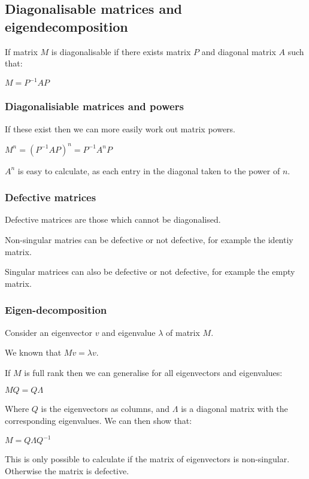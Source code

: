 
\subsection{Diagonalisable matrices and eigendecomposition}

If matrix \(M\) is diagonalisable if there exists matrix \(P\) and diagonal matrix \(A\) such that:

\(M=P^{-1}AP\)

\subsubsection{Diagonalisiable matrices and powers}

If these exist then we can more easily work out matrix powers.

\(M^n=(P^{-1}AP)^n=P^{-1}A^nP\)

\(A^n\) is easy to calculate, as each entry in the diagonal taken to the power of \(n\).

\subsubsection{Defective matrices}

Defective matrices are those which cannot be diagonalised.

Non-singular matries can be defective or not defective, for example the identiy matrix.

Singular matrices can also be defective or not defective, for example the empty matrix.

\subsubsection{Eigen-decomposition}

Consider an eigenvector \(v\) and eigenvalue \(\lambda \) of matrix \(M\).

We known that \(Mv=\lambda v\).

If \(M\) is full rank then we can generalise for all eigenvectors and eigenvalues:

\(MQ=Q\Lambda\)

Where \(Q\) is the eigenvectors as columns, and \(\Lambda \) is a diagonal matrix with the corresponding eigenvalues. We can then show that:

\(M=Q\Lambda Q^{-1}\)

This is only possible to calculate if the matrix of eigenvectors is non-singular. Otherwise the matrix is defective.

